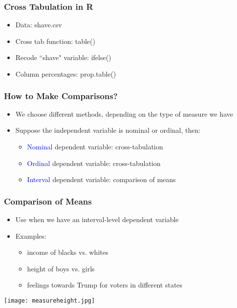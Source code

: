 \documentclass{beamer}
\newcommand{\blue}{\textcolor{blue}}
\begin{document}
\begin{frame}
 \frametitle<+->{Cross Tabulation in R}
 \begin{itemize}[<+->]
   \item Data: shave.csv
   \item Cross tab function: table()
   \item Recode ``shave" variable: ifelse()   
   \item Column percentages: prop.table()
 \end{itemize}
 \bigskip
\end{frame}

\begin{frame}
 \frametitle{How to Make Comparisons?}
 \begin{itemize}
   \item We choose different methods, depending on the \alert{type of measure} we have
   \item Suppose the \alert{independent variable} is nominal or ordinal, then:
     \begin{itemize}
       \item \blue{Nominal} \alert{dependent variable}: cross-tabulation
       \item \blue{Ordinal} \alert{dependent variable}: cross-tabulation
       \item \blue{Interval} \alert{dependent variable}: comparison of means
     \end{itemize}
 \end{itemize}
\end{frame}

\begin{frame}
 \frametitle<+->{Comparison of Means}
 \begin{minipage}{.48\linewidth}
 \begin{itemize}[<+->]
   \item Use when we have an interval-level dependent variable
   \item Examples:
     \begin{itemize}
       \item income of blacks vs. whites
       \item height of boys vs. girls
       \item feelings towards Trump for voters in different states 
     \end{itemize}
 \end{itemize}
 \end{minipage}\hfill
 \begin{minipage}{.48\linewidth}
 \texttt{[image: measureheight.jpg]}
 \end{minipage}
\end{frame}
\end{document}
